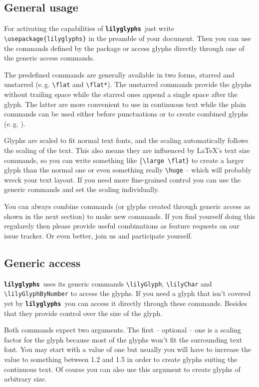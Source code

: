 \documentclass{article}
\newcommand{\lilyglyphs}{\texttt{\textbf{lilyglyphs }}}
\newcommand*{\cmd}[1]{\texttt{\textbackslash #1}}
\begin{document}
\subsection{General usage}
For activating the capabilities of \lilyglyphs just write \cmd{usepackage\{lilyglyphs\}} in the preamble of your document. Then you can use the commands defined by the package or access glyphs directly through one of the generic access commands.

The predefined commands are generally available in two forms, starred and unstarred (e.\,g. \cmd{flat} and \cmd{flat*}). The unstarred commands provide the glyphs without trailing space while the starred ones append a single space after the glyph. The latter are more convenient to use in continuous text while the plain commands can be used either before punctuations or to create combined glyphs (e.\,g. \lilyS\lilyF\lilyF\lilyZ).

Glyphs are scaled to fit normal text fonts, and the scaling automatically follows the scaling of the text. This also means they are influenced by \LaTeX 's text size commands, so you can write something like \{\cmd{large \textbackslash flat\}} to create a larger {\large \flat} glyph than the normal \flat* one or even something really \cmd{huge} {\huge \lilySFZ} -- which will probably wreck your text layout. If you need more fine-grained control you can use the generic commands and set the scaling individually.

You can always combine commands (or glyphs created through generic access as shown in the next section) to make new commands. If you find yourself doing this regularely then please provide useful combinations as feature requests on our issue tracker. Or even better, join us and participate yourself.



\subsection{Generic access}
\lilyglyphs uses its generic commands \cmd{lilyGlyph}, \cmd{lilyChar} and \cmd{lilyGlyphByNumber} to access the glyphs. If you need a glyph that isn't covered yet by \lilyglyphs you can access it directly through these commands. Besides that they provide control over the size of the glyph.

Both commands expect two arguments. The first -- optional -- one is a scaling factor for the glyph because most of the glyphs won't fit the surrounding text font. You may start with a value of one but usually you will have to increase the value to something between 1.2 and 1.5 in order to create glyphs suiting the continuous text. Of course you can also use this argument to create glyphs of arbitrary size. 
\end{document}

